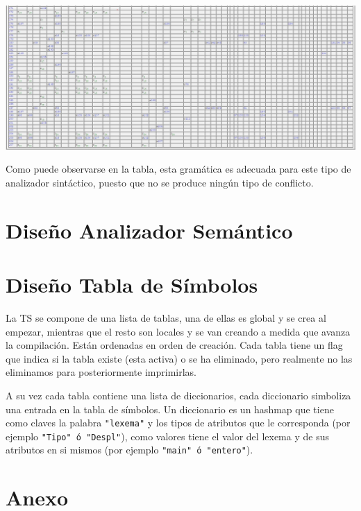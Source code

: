 \documentclass[11pt, , a4paper, titlepage]{article}
\newenvironment{changemargin}[2]{%
\begin{list}{}{%
\setlength{\topsep}{0pt}%
\setlength{\leftmargin}{#1}%
\setlength{\rightmargin}{#2}%
\setlength{\listparindent}{\parindent}%
\setlength{\itemindent}{\parindent}%
\setlength{\parsep}{\parskip}%
}%
\item[]}{\end{list}}
\begin{document}
\begin{changemargin}{-2.5cm}{+2.5cm}
\begin{center}
        \includegraphics[width=1.27\textwidth]{./resources/tabla-LR/Tabla5.jpg}
    \end{center}
\end{changemargin}

\vspace{3mm}
Como puede observarse en la tabla\cite{TABLA-LR}, esta gramática es adecuada para este tipo de analizador sintáctico, puesto que no se produce ningún tipo de conflicto.
\clearpage

\section{Diseño Analizador Semántico}
\clearpage

\section{Diseño Tabla de Símbolos}
La TS se compone de una lista de tablas, una de ellas es global y se crea al empezar, mientras que el resto son locales y se van creando %
a medida que avanza la compilación. Están ordenadas en orden de creación. %
Cada tabla tiene un flag que indica si la tabla existe (esta activa) o se ha eliminado, pero realmente no las eliminamos para posteriormente imprimirlas.

A su vez cada tabla contiene una lista de diccionarios, cada diccionario simboliza una entrada en la tabla de símbolos. %
Un diccionario es un hashmap que tiene como claves la palabra \verb|"lexema"| y los tipos de atributos que le corresponda %
(por ejemplo \verb|"Tipo" ó "Despl"|), como valores tiene el valor del lexema y de sus atributos en si mismos (por ejemplo \verb|"main" ó "entero"|).
\clearpage

\section{Anexo}
\end{document}
